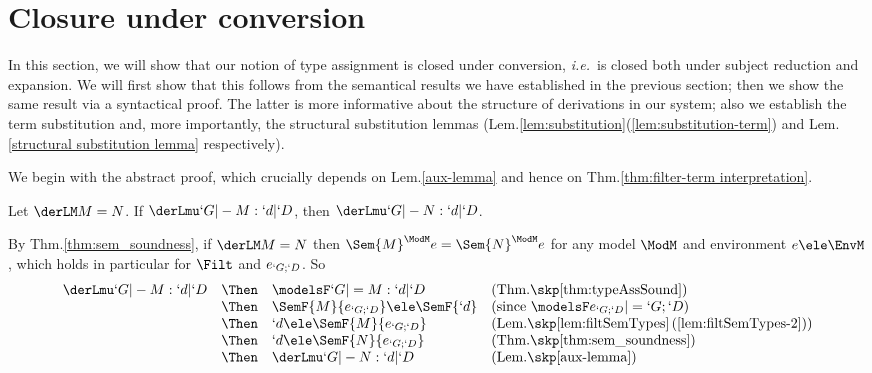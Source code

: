 \documentclass{CSML}
\def\ie{\emph{i.e.}}
\begin{document}


 \section{Closure under conversion} \label{sec:closureUnderConv} 

In this section, we will show that our notion of type assignment is closed under conversion, \ie~is closed both under subject reduction and expansion.
We will first show that this follows from the semantical results we have established in the previous section; then we show the same result via a syntactical proof. 
The latter is more informative about the structure of derivations in our system; also we establish the term substitution and, more importantly, the structural substitution lemmas (Lem.\skp\ref{lem:substitution}\skp(\ref{lem:substitution-term}) and Lem.\skp\ref{structural substitution lemma} respectively).

We begin with the abstract proof, which crucially depends on Lem.\skp\ref{aux-lemma} and hence on Thm.\skp\ref{thm:filter-term interpretation}.

 \begin{thm} \label{thm:convInvariance}
Let $ \derLM M = N $. If $ \derLmu `G |- M : `d | `D $, then $ \derLmu `G |- N : `d | `D $.
 \end{thm}

\proof%
By Thm.\skp\ref{thm:sem_soundness}, if $\derLM M = N $ then $\Sem{ M }^{\ModM}{ e } = \Sem{ N }^{\ModM}{ e }$ for any 
model ${\ModM}$ and environment $e \ele \EnvM$, which holds in particular for $\Filt$ and $ e_{`G;`D }$. So 
%
 \[ \begin{array}[t]{rcl@{\quad}l}
 \derLmu `G |- M : `d | `D 
	& \Then &
 \modelsF `G |= M : `d | `D & (\textrm{Thm.\skp\ref{thm:typeAssSound}})
	\\ & \Then &
	\SemF { M }{ e_{`G;`D } } \ele \SemF {`d} & (\textrm{since } \modelsF e_{`G;`D } |= `G;`D )
	\\ & \Then &
`d \ele \SemF { M }{ e_{`G;`D } } & (\textrm{Lem.\skp\ref{lem:filtSemTypes}\,(\ref{lem:filtSemTypes-2})})
	\\ & \Then &
`d \ele \SemF {N}{ e_{`G;`D } } & (\textrm{Thm.\skp\ref{thm:sem_soundness}})
	\\ & \Then &
 \derLmu `G |- N : `d | `D & (\textrm{Lem.\skp\ref{aux-lemma}})
 \end{array} \]
\arrayqed[-22pt]
\end{document}

